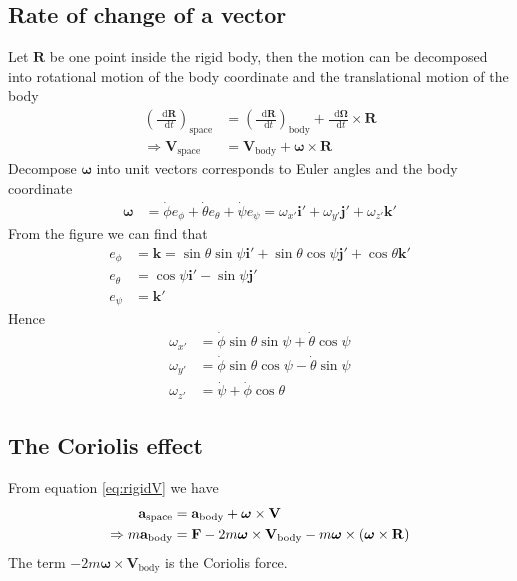 \documentclass[twoside,9pt]{article}
\numberwithin{equation}{section} %
\renewcommand*\d{\mathop{}\!\mathrm{d}}
\theoremstyle{definition}
\theoremstyle{remark}
\begin{document}
\subsection{Rate of change of a vector}
Let $\mathbf{R}$ be one point inside the rigid body, then
the motion can be decomposed into rotational motion of the
body coordinate and the translational motion of the body
\begin{align}
    \left(\frac{\d\mathbf{R}}{\d t}\right)_\text{space}
    &= \left(\frac{\d\mathbf{R}}{\d t}\right)_\text{body}
    + \frac{\d\boldsymbol{\Omega}}{\d t}\times\mathbf{R}\\
    \Rightarrow
    \mathbf{V}_\text{space} &= \mathbf{V}_\text{body}
    + \boldsymbol{\omega}\times\mathbf{R}
    \label{eq:rigidV}
\end{align}
Decompose $\boldsymbol{\omega}$ into unit vectors corresponds
to Euler angles and the body coordinate
\begin{align}
    \boldsymbol{\omega} &= 
    \dot\phi e_\phi + \dot\theta e_\theta + \dot\psi e_\psi
    = \omega_{x'}\mathbf{i}' + \omega_{y'}\mathbf{j}'
    + \omega_{z'}\mathbf{k}'
\end{align}
From the figure we can find that
\begin{align}
    e_\phi &= \mathbf{k}
    = \sin\theta\sin\psi\mathbf{i}' + \sin\theta\cos\psi\mathbf{j}'
    + \cos\theta\mathbf{k}'\\
    e_\theta &= \cos\psi\mathbf{i}' - \sin\psi\mathbf{j}'\\
    e_\psi &= \mathbf{k}'
\end{align}
Hence
\begin{align}
    \omega_{x'} &= \dot\phi\sin\theta\sin\psi + \dot\theta\cos\psi\\
    \omega_{y'} &= \dot\phi\sin\theta\cos\psi - \dot\theta\sin\psi\\
    \omega_{z'} &= \dot\psi + \dot\phi\cos\theta
\end{align}

\subsection{The Coriolis effect}
From equation \ref{eq:rigidV} we have
\begin{align}
    \mathbf{a}_\text{space} &=
    \mathbf{a}_\text{body}  + \boldsymbol{\omega}\times\mathbf{V}_\text{\space}\\
    \Rightarrow
    m\mathbf{a}_\text{body} &= 
    \mathbf{F} - 2m\boldsymbol{\omega}\times\mathbf{V}_\text{body}
    - m\boldsymbol{\omega}\times(\boldsymbol{\omega}\times\mathbf{R})
\end{align}
The term $-2m\boldsymbol{\omega}\times\mathbf{V}_\text{body}$
is the Coriolis force.
\end{document}
